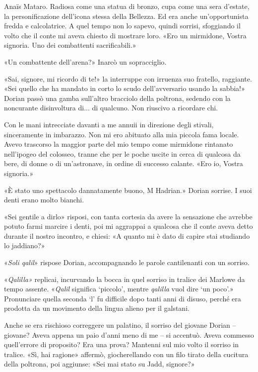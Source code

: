 Anaïs Mataro. Radiosa come una statua di bronzo, cupa come una sera
d'estate, la personificazione dell'icona stessa della Bellezza. Ed era
anche un'opportunista fredda e calcolatrice. A quel tempo non lo sapevo,
quindi sorrisi, sfoggiando il volto che il conte mi aveva chiesto di
mostrare loro. «Ero un mirmidone, Vostra signoria. Uno dei combattenti
sacrificabili.»

«Un combattente dell'arena?» Inarcò un sopracciglio.

«Sai, signore, mi ricordo di te!» la interruppe con irruenza suo
fratello, raggiante. «Sei quello che ha mandato in corto lo scudo
dell'avversario usando la sabbia!» Dorian passò una gamba sull'altro
bracciolo della poltrona, sedendo con la noncurante disinvoltura di...
di qualcuno. Non riuscivo a ricordare chi.

Con le mani intrecciate davanti a me annuii in direzione degli stivali,
sinceramente in imbarazzo. Non mi ero abituato alla mia piccola fama
locale. Avevo trascorso la maggior parte del mio tempo come mirmidone
rintanato nell'ipogeo del colosseo, tranne che per le poche uscite in
cerca di qualcosa da bere, di donne o di un'astronave, in ordine di
successo calante. «Ero io, Vostra signoria.»

«È stato uno spettacolo dannatamente buono, M Hadrian.» Dorian sorrise.
I suoi denti erano molto bianchi.

«Sei gentile a dirlo» risposi, con tanta cortesia da avere la sensazione
che avrebbe potuto farmi marcire i denti, poi mi aggrappai a qualcosa
che il conte aveva detto durante il nostro incontro, e chiesi: «A quanto
mi è dato di capire stai studiando lo jaddiano?»

«\emph{Soli qalil}» rispose Dorian, accompagnando le parole cantilenanti
con un sorriso.

«\emph{Qalilla»} replicai, incurvando la bocca in quel sorriso in
tralice dei Marlowe da tempo assente. «\emph{Qalil} significa `piccolo',
mentre \emph{qalilla} vuol dire `un poco'.» Pronunciare quella seconda
`l' fu difficile dopo tanti anni di disuso, perché era prodotta da un
movimento della lingua alieno per il galstani.

Anche se era rischioso correggere un palatino, il sorriso del giovane
Dorian -- giovane? Aveva appena un paio d'anni meno di me -- si
accentuò. Aveva commesso quell'errore di proposito? Era una prova?
Mantenni sul mio volto il sorriso in tralice. «Sì, hai ragione» affermò,
giocherellando con un filo tirato della cucitura della poltrona, poi
aggiunse: «Sei mai stato su Jadd, signore?»

